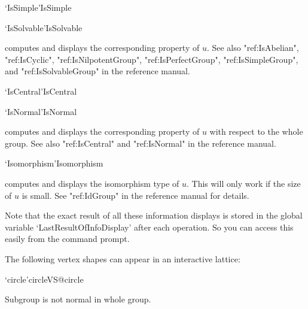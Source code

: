 \>`IsSimple'{IsSimple}

\>`IsSolvable'{IsSolvable}

computes and displays the corresponding property of $u$.  See also
"ref:IsAbelian", "ref:IsCyclic", "ref:IsNilpotentGroup", "ref:IsPerfectGroup",
"ref:IsSimpleGroup", and "ref:IsSolvableGroup"  in the {\GAP}
reference manual.

\>`IsCentral'{IsCentral}

\>`IsNormal'{IsNormal}

computes and displays the corresponding  property of $u$ with respect  to
the whole group.  See also "ref:IsCentral" and "ref:IsNormal" in the {\GAP}
reference manual.

\>`Isomorphism'{Isomorphism}

computes and displays  the isomorphism type of  $u$.  This will only work
if the size of $u$ is small.  See "ref:IdGroup"  in the {\GAP}
reference manual for details.

\bigskip

Note that the exact result of all these information displays is stored in
the global variable `LastResultOfInfoDisplay' after each operation. So you
can access this easily from the {\GAP} command prompt.


%
%
%
%
%
%
%
%
%
%



The following vertex shapes can appear in an interactive lattice:

\>`circle'{circleVS}@{circle}

  Subgroup is not normal in whole group.

